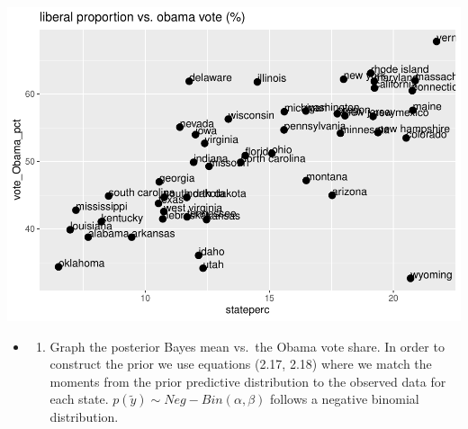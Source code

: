 \documentclass[
]{book}
\newenvironment{Shaded}{\begin{snugshade}}{\end{snugshade}}
\newcommand{\AttributeTok}[1]{\textcolor[rgb]{0.77,0.63,0.00}{#1}}
\newcommand{\DecValTok}[1]{\textcolor[rgb]{0.00,0.00,0.81}{#1}}
\newcommand{\FunctionTok}[1]{\textcolor[rgb]{0.00,0.00,0.00}{#1}}
\newcommand{\NormalTok}[1]{#1}
\newcommand{\SpecialCharTok}[1]{\textcolor[rgb]{0.00,0.00,0.00}{#1}}
\newcommand{\StringTok}[1]{\textcolor[rgb]{0.31,0.60,0.02}{#1}}
\providecommand{\tightlist}{%
  \setlength{\itemsep}{0pt}\setlength{\parskip}{0pt}}
\theoremstyle{definition}
\theoremstyle{definition}
\theoremstyle{definition}
\theoremstyle{definition}
\theoremstyle{remark}
\begin{document}
\begin{Shaded}
\end{Shaded}

\includegraphics{_main_files/figure-latex/unnamed-chunk-28-2.pdf}

\begin{itemize}
\item
  \begin{enumerate}
  \def\labelenumi{(\alph{enumi})}
  \setcounter{enumi}{1}
  \tightlist
  \item
    Graph the posterior Bayes mean vs.~the Obama vote share.
    In order to construct the prior we use equations (2.17, 2.18) where we match the moments from the prior predictive distribution to the observed data for each state. \(p(\tilde{y})\sim Neg-Bin(\alpha, \beta)\) follows a negative binomial distribution.
  \end{enumerate}
\end{itemize}
\end{document}

